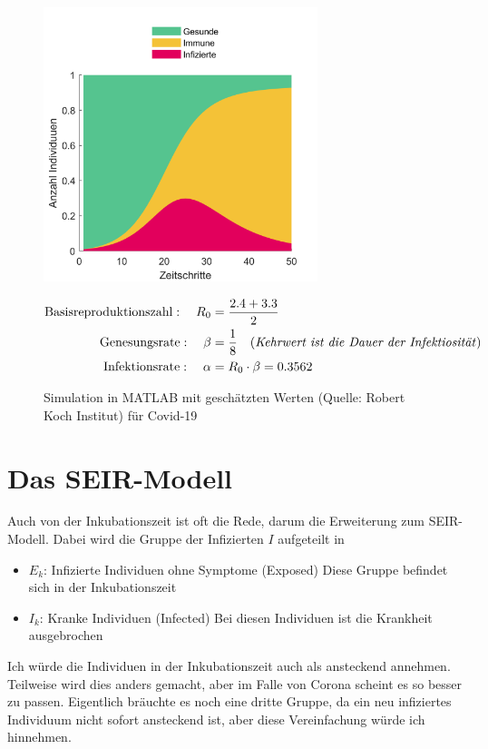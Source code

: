 \documentclass[11pt,a4paper]{article}
\begin{document}
\begin{figure}[h]
  	\centering
 	\includegraphics[width=8cm]{SIR.png}
  	\caption{Simulation in MATLAB mit geschätzten Werten (Quelle: Robert Koch Institut) für Covid-19}
  	\begin{align*}
  		\textrm{Basisreproduktionszahl}:\quad
  		R_0 &= \frac{2.4 + 3.3}{2}\\
  		\textrm{Genesungsrate}:\quad
  		\beta &= \frac{1}{8} \quad
  		\textrm{(\textit{Kehrwert ist die Dauer der Infektiosität})}\\
  		\textrm{Infektionsrate}:\quad
  		\alpha &= R_0 \cdot \beta = 0.3562\
  	\end{align*}
\end{figure}


\section{Das SEIR-Modell}
Auch von der Inkubationszeit ist oft die Rede, darum die Erweiterung zum SEIR-Modell. Dabei wird die Gruppe der Infizierten \(I\) aufgeteilt in
\begin{itemize}
	\item \(E_k\): Infizierte Individuen ohne Symptome (Exposed)
Diese Gruppe befindet sich in der Inkubationszeit
	\item \(I_k\): Kranke Individuen (Infected)
Bei diesen Individuen ist die Krankheit ausgebrochen
\end{itemize}
Ich würde die Individuen in der Inkubationszeit auch als ansteckend annehmen. Teilweise wird dies anders gemacht, aber im Falle von Corona scheint es so besser zu passen.
Eigentlich bräuchte es noch eine dritte Gruppe, da ein neu infiziertes Individuum nicht sofort ansteckend ist, aber diese Vereinfachung würde ich hinnehmen.
\end{document}
